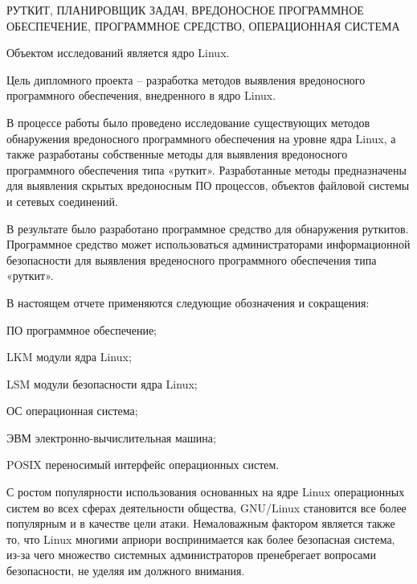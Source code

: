 \documentclass{gost7.32-2001}
\begin{document}
\maketitle

\setcounter{page}{2}
\info

РУТКИТ, ПЛАНИРОВЩИК ЗАДАЧ, ВРЕДОНОСНОЕ ПРОГРАММНОЕ ОБЕСПЕЧЕНИЕ,
ПРОГРАММНОЕ СРЕДСТВО, ОПЕРАЦИОННАЯ СИСТЕМА

Объектом исследований является ядро Linux.

Цель дипломного проекта – разработка методов выявления вредоносного
программного обеспечения, внедренного в ядро Linux.

В процессе работы было проведено исследование существующих методов
обнаружения вредоносного программного обеспечения на уровне ядра Linux,
а также разработаны собственные методы для выявления вредоносного
программного обеспечения типа «руткит». Разработанные методы
предназначены для выявления скрытых вредоносным ПО процессов, объектов
файловой системы и сетевых соединений.

В результате было разработано программное средство для обнаружения
руткитов. Программное средство может использоваться
администраторами информационной безопасности для выявления
вреденосного программного обеспечения типа «руткит».
\newpage

\tableofcontents


В настоящем отчете применяются следующие обозначения и сокращения:

ПО \dash программное обеспечение;

LKM \dash модули ядра Linux;

LSM \dash модули безопасности ядра Linux;

ОС \dash операционная система;

ЭВМ \dash электронно-вычислительная машина;

POSIX \dash переносимый интерфейс операционных систем.


С ростом популярности использования основанных на ядре Linux
операционных систем во всех сферах деятельности общества, GNU/Linux
становится все более популярным и в качестве цели атаки. Немаловажным
фактором является также то, что Linux многими априори воспринимается как
более безопасная система, из-за чего множество системных
администраторов пренебрегает вопросами безопасности, не уделяя им
должного внимания.
\end{document}
